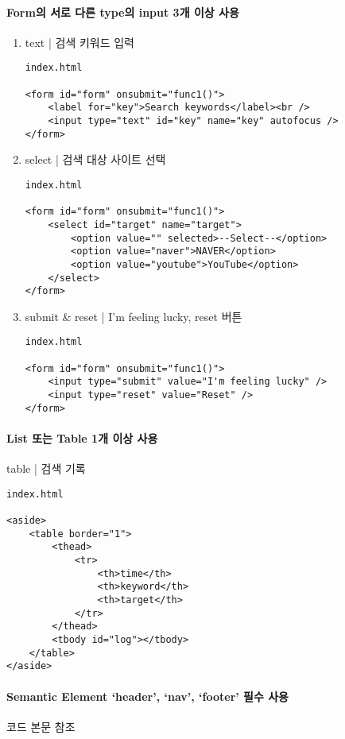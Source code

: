 \documentclass[a4paper, titlepage]{article}
\begin{document}
\paragraph{Form의 서로 다른 type의 input 3개 이상 사용}
\begin{enumerate}
    \item{text | }검색 키워드 입력
    \begin{verbatim}
index.html

<form id="form" onsubmit="func1()">
    <label for="key">Search keywords</label><br />
    <input type="text" id="key" name="key" autofocus />
</form>
    \end{verbatim}
    \item{select | }검색 대상 사이트 선택
    \begin{verbatim}
index.html

<form id="form" onsubmit="func1()">
    <select id="target" name="target">
        <option value="" selected>--Select--</option>
        <option value="naver">NAVER</option>
        <option value="youtube">YouTube</option>
    </select>
</form>
    \end{verbatim}
    \item{submit \& reset | }I'm feeling lucky, reset 버튼
    \begin{verbatim}
index.html

<form id="form" onsubmit="func1()">
    <input type="submit" value="I'm feeling lucky" />
    <input type="reset" value="Reset" />
</form>
    \end{verbatim}
\end{enumerate}


\paragraph{List 또는 Table 1개 이상 사용}

table | 검색 기록
\begin{verbatim}
index.html

<aside>
    <table border="1">
        <thead>
            <tr>
                <th>time</th>
                <th>keyword</th>
                <th>target</th>
            </tr>
        </thead>
        <tbody id="log"></tbody>
    </table>
</aside>
\end{verbatim}

\paragraph{Semantic Element ‘header’, ‘nav’, ‘footer’ 필수 사용}
코드 본문 참조
\end{document}
